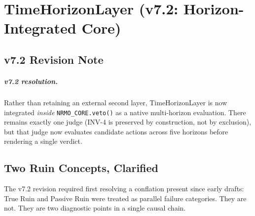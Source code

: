 
\chapter{TimeHorizonLayer (v7.2: Horizon-Integrated Core)}
\label{ch:time-horizon-layer}

\section*{v7.2 Revision Note}


\paragraph{v7.2 resolution.}
Rather than retaining an external second layer, TimeHorizonLayer is
now integrated \emph{inside} \texttt{NRMO\_CORE.veto()} as a native
multi-horizon evaluation. There remains exactly one judge (INV-4 is
preserved by construction, not by exclusion), but that judge now
evaluates candidate actions across five horizons before rendering a
single verdict.

\section{Two Ruin Concepts, Clarified}
\label{sec:time-horizon-two-ruins}

The v7.2 revision required first resolving a conflation present since
early drafts: True Ruin and Passive Ruin were treated as parallel
failure categories. They are not. They are two diagnostic points in a
single causal chain.

